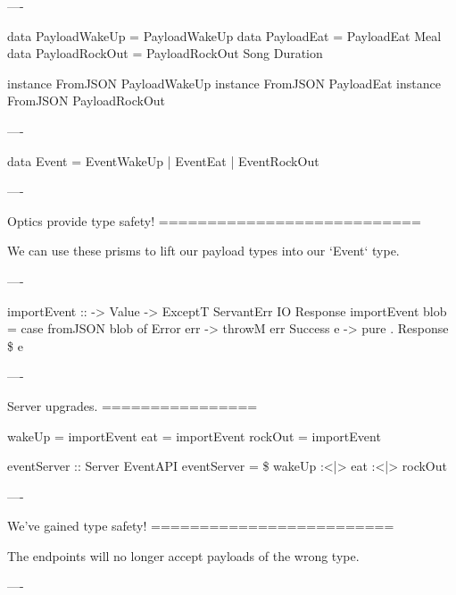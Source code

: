 ----

\begin{hs}
  data PayloadWakeUp  = PayloadWakeUp
  data PayloadEat     = PayloadEat     Meal
  data PayloadRockOut = PayloadRockOut Song Duration

  instance FromJSON PayloadWakeUp
  instance FromJSON PayloadEat
  instance FromJSON PayloadRockOut
\end{hs}

----

\begin{raw}

  data Event = EventWakeUp  
             | EventEat     
             | EventRockOut 

\end{raw}

----

Optics provide type safety!
===========================

We can use these prisms to lift our payload types into our `Event` type.

----

\begin{raw}

  importEvent :: 
              -> Value
              -> ExceptT ServantErr IO Response
  importEvent  blob =
    case fromJSON blob of
      Error   err -> throwM err
      Success e   -> pure . Response \$  e
\end{raw}

----

Server upgrades.
================

\begin{raw}
  wakeUp  = importEvent 
  eat     = importEvent 
  rockOut = importEvent 

  eventServer :: Server EventAPI
  eventServer =  \$
    wakeUp :<|> eat :<|> rockOut
\end{raw}

----

We've gained type safety!
=========================

The endpoints will no longer accept payloads of the wrong type.

----

